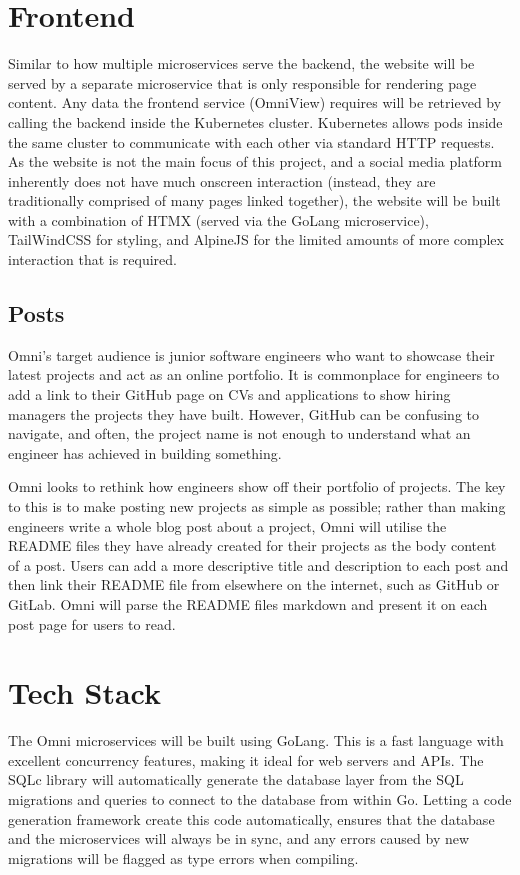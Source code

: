 \section{Frontend}
\label{sec:design-system-frontend}
Similar to how multiple microservices serve the backend, the website will be served by a separate microservice that is only responsible for rendering page content.
Any data the frontend service (OmniView) requires will be retrieved by calling the backend inside the Kubernetes cluster. Kubernetes allows pods inside the same cluster to communicate with each other via standard HTTP requests.
As the website is not the main focus of this project, and a social media platform inherently does not have much onscreen interaction (instead, they are traditionally comprised of many pages linked together), the website will be built with a combination of HTMX (served via the GoLang microservice), TailWindCSS for styling, and AlpineJS for the limited amounts of more complex interaction that is required.

\subsection{Posts}
Omni's target audience is junior software engineers who want to showcase their latest projects and act as an online portfolio.
It is commonplace for engineers to add a link to their GitHub page on CVs and applications to show hiring managers the projects they have built.
However, GitHub can be confusing to navigate, and often, the project name is not enough to understand what an engineer has achieved in building something.

Omni looks to rethink how engineers show off their portfolio of projects. The key to this is to make posting new projects as simple as possible; rather than making engineers write a whole blog post about a project, Omni will utilise the README files they have already created for their projects as the body content of a post.
Users can add a more descriptive title and description to each post and then link their README file from elsewhere on the internet, such as GitHub or GitLab.
Omni will parse the README files markdown and present it on each post page for users to read.

\section{Tech Stack}
\label{sec:design-review}
The Omni microservices will be built using GoLang. This is a fast language with excellent concurrency features, making it ideal for web servers and APIs.
The SQLc library will automatically generate the database layer from the SQL migrations and queries to connect to the database from within Go.
Letting a code generation framework create this code automatically, ensures that the database and the microservices will always be in sync, and any errors caused by new migrations will be flagged as type errors when compiling. 

